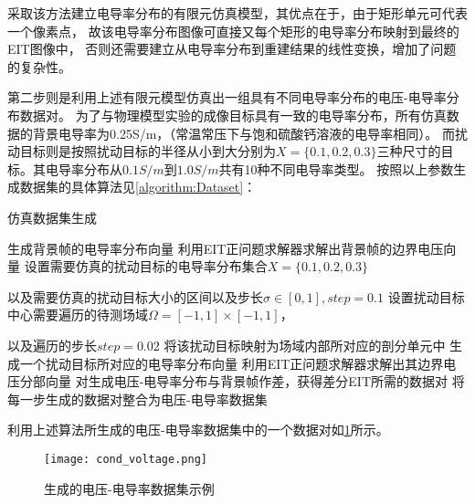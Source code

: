 采取该方法建立电导率分布的有限元仿真模型，其优点在于，由于矩形单元可代表一个像素点，
故该电导率分布图像可直接又每个矩形的电导率分布映射到最终的EIT图像中，
否则还需要建立从电导率分布到重建结果的线性变换，增加了问题的复杂性。

第二步则是利用上述有限元模型仿真出一组具有不同电导率分布的电压-电导率分布数据对。
为了与物理模型实验的成像目标具有一致的电导率分布，所有仿真数据的背景电导率为0.25S/m，（常温常压下与饱和硫酸钙溶液的电导率相同）。
而扰动目标则是按照扰动目标的半径从小到大分别为$ X = \{0.1, 0.2, 0.3\}$三种尺寸的目标。其电导率分布从$0.1S/m$到$1.0S/m$共有10种不同电导率类型。
按照以上参数生成数据集的具体算法见\cref{algorithm:Dataset}：

\begin{algorithm}[H]
    
    \caption{仿真数据集生成}
    \begin{algorithmic}[1]
        \State 生成背景帧的电导率分布向量
        \State 利用EIT正问题求解器求解出背景帧的边界电压向量
        \State 设置需要仿真的扰动目标的电导率分布集合$X = \{0.1, 0.2, 0.3\}$
        
        以及需要仿真的扰动目标大小的区间以及步长$\sigma \in \left[0, 1\right], step = 0.1$
        \State 设置扰动目标中心需要遍历的待测场域$\Omega = \left[-1, 1\right] \times \left[-1, 1\right]$，

        以及遍历的步长$step=0.02$
        \State 将该扰动目标映射为场域内部所对应的剖分单元中
        \State 生成一个扰动目标所对应的电导率分布向量
        \State 利用EIT正问题求解器求解出其边界电压分部向量
        \State 对生成电压-电导率分布与背景帧作差，获得差分EIT所需的数据对
        \EndFor
        \EndIf
       \EndFor
       \EndFor
       \State 将每一步生成的数据对整合为电压-电导率数据集
    \end{algorithmic}
    \label{algorithm:Dataset}
\end{algorithm}

利用上述算法所生成的电压-电导率数据集中的一个数据对如\cref{figure:cond_voltage}所示。

\begin{figure}[h]
    \centering
    \texttt{[image: cond\_voltage.png]}
    \caption{生成的电压-电导率数据集示例}
    \label{figure:cond_voltage}
\end{figure}


